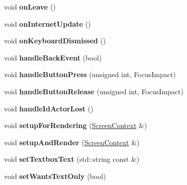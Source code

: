 \begin{DoxyCompactItemize}
void {\bfseries on\+Leave} ()
\item 
\mbox{\label{struct_base_screen_a70d42c778d7884611545b62fc2b9da79}} 
void {\bfseries on\+Internet\+Update} ()
\item 
\mbox{\label{struct_base_screen_a0412d6b01b894776c3c81a3022306909}} 
void {\bfseries on\+Keyboard\+Dismissed} ()
\item 
\mbox{\label{struct_base_screen_a5c96d7342eb6577ea45e02456b3d9419}} 
void {\bfseries handle\+Back\+Event} (bool)
\item 
\mbox{\label{struct_base_screen_a8544bd309ac19f0b4f1f9577d6ee8c79}} 
void {\bfseries handle\+Button\+Press} (unsigned int, Focus\+Impact)
\item 
\mbox{\label{struct_base_screen_ad4eb1507f2f629dbcabe79ab09b36c48}} 
void {\bfseries handle\+Button\+Release} (unsigned int, Focus\+Impact)
\item 
\mbox{\label{struct_base_screen_a68af453886b1b64d234ee8baf6cc67f0}} 
void {\bfseries handle\+Id\+Actor\+Lost} ()
\item 
\mbox{\label{struct_base_screen_a6286ba8e2150bf4f2beac41896386a8a}} 
void {\bfseries setup\+For\+Rendering} (\mbox{\hyperlink{struct_screen_context}{Screen\+Context}} \&)
\item 
\mbox{\label{struct_base_screen_ad364be86d6822ed9378b6d139b5540c4}} 
void {\bfseries setup\+And\+Render} (\mbox{\hyperlink{struct_screen_context}{Screen\+Context}} \&)
\item 
\mbox{\label{struct_base_screen_a4d191f6e3667694fadaf9a569a22d330}} 
void {\bfseries set\+Textbox\+Text} (std\+::string const \&)
\item 
\mbox{\label{struct_base_screen_ab0ce0bc2b47802967c047a0e3ebc0e9d}} 
void {\bfseries set\+Wants\+Text\+Only} (bool)
\item 
\mbox{\label{struct_base_screen_acbc50fcfb56c4d71ce1d346b4abfc981}} 

\end{DoxyCompactItemize}
